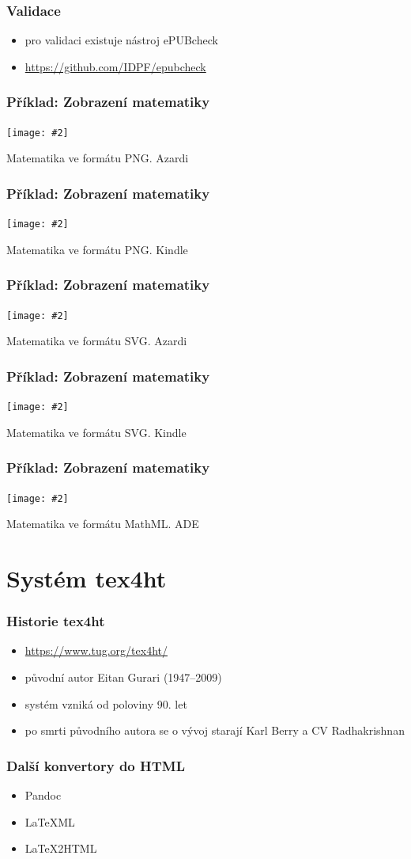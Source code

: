 \documentclass[czech]{beamer}
\newcommand\myfig[3][width=.9\textwidth]{%
  \figure\texttt{[image: \#2]}%
  \caption{#3}%
\endfigure}
\begin{document}
\begin{frame}
  \frametitle{Validace}
  \begin{itemize}
    \item pro validaci existuje nástroj ePUBcheck
    \item \url{https://github.com/IDPF/epubcheck}
  \end{itemize}
\end{frame}
\begin{frame}
  \frametitle{Příklad: Zobrazení matematiky}
  {\myfig{examples/png-epub.png}{Matematika ve formátu PNG. Azardi}}
\end{frame}
\begin{frame}
  \frametitle{Příklad: Zobrazení matematiky}
  {\myfig{examples/png-mobi.png}{Matematika ve formátu PNG. Kindle}}
\end{frame}
\begin{frame}
  \frametitle{Příklad: Zobrazení matematiky}
  \myfig{examples/svg-epub.png}{Matematika ve formátu SVG. Azardi}
\end{frame}
\begin{frame}
  \frametitle{Příklad: Zobrazení matematiky}
  \myfig[height=0.6\paperheight]{examples/svg-mobi.png}{Matematika ve formátu SVG. Kindle}
\end{frame}
\begin{frame}
  \frametitle{Příklad: Zobrazení matematiky}
  \myfig{examples/mathml-ade.png}{Matematika ve formátu MathML. ADE}
\end{frame}

  \section{Systém tex4ht}
\begin{frame}
  \frametitle{Historie tex4ht}
  \begin{itemize}
    \item \url{https://www.tug.org/tex4ht/}
    \item původní autor Eitan Gurari (1947--2009)
    \item systém vzniká od poloviny 90. let
    \item po smrti původního autora se o vývoj starají Karl Berry a CV Radhakrishnan
  \end{itemize}
\end{frame}

\begin{frame}
  \frametitle{Další konvertory do HTML}
  \begin{itemize}
    \item Pandoc
    \item LaTeXML
    \item LaTeX2HTML
  \end{itemize}
\end{frame}
\end{document}
